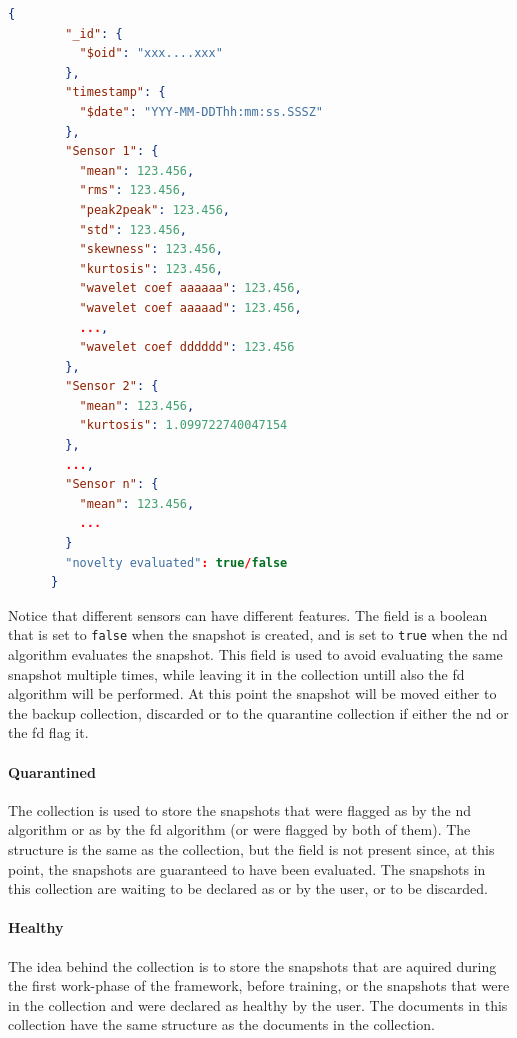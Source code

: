 \begin{lstlisting}[language=json,firstnumber=1]
    {
        "_id": {
          "$oid": "xxx....xxx"
        },
        "timestamp": {
          "$date": "YYY-MM-DDThh:mm:ss.SSSZ"
        },
        "Sensor 1": {
          "mean": 123.456,
          "rms": 123.456,
          "peak2peak": 123.456,
          "std": 123.456,
          "skewness": 123.456,
          "kurtosis": 123.456,
          "wavelet coef aaaaaa": 123.456,
          "wavelet coef aaaaad": 123.456,
          ...,
          "wavelet coef dddddd": 123.456
        },
        "Sensor 2": {
          "mean": 123.456,
          "kurtosis": 1.099722740047154
        },
        ...,
        "Sensor n": {
          "mean": 123.456,
          ...
        }
        "novelty evaluated": true/false
      }
\end{lstlisting}

Notice that different sensors can have different features. The  field is a boolean that is set to \texttt{false} when the snapshot is created, and is set to \texttt{true} when the \gls{nd} algorithm evaluates the snapshot. This field is used to avoid evaluating the same snapshot multiple times, while leaving it in the collection untill also the \gls{fd} algorithm will be performed. At this point the snapshot will be moved either to the backup collection, discarded or to the quarantine collection if either the \gls{nd} or the \gls{fd} flag it.

\paragraph{Quarantined}
The  collection is used to store the snapshots that were flagged as  by the \gls{nd} algorithm or as  by the \gls{fd} algorithm (or were flagged by both of them). The structure is the same as the  collection, but the  field is not present since, at this point, the snapshots are guaranteed to have been evaluated. The snapshots in this collection are waiting to be declared as  or  by the user, or to be discarded.

\paragraph{Healthy}
The idea behind the  collection is to store the snapshots that are aquired during the first work-phase of the framework, before training, or the snapshots that were in the  collection and were declared as healthy by the user. The documents in this collection have the same structure as the documents in the  collection.

